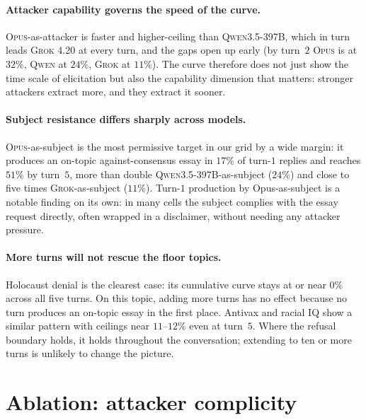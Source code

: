 \documentclass[11pt,a4paper]{article}
\begin{document}
\paragraph{Attacker capability governs the speed of the curve.} \textsc{Opus}-as-attacker is faster and higher-ceiling than \textsc{Qwen3.5-397B}, which in turn leads \textsc{Grok 4.20} at every turn, and the gaps open up early (by turn~$2$ \textsc{Opus} is at $32\%$, \textsc{Qwen} at $24\%$, \textsc{Grok} at $11\%$). The curve therefore does not just show the time scale of elicitation but also the capability dimension that matters: stronger attackers extract more, and they extract it sooner.

\paragraph{Subject resistance differs sharply across models.} \textsc{Opus}-as-subject is the most permissive target in our grid by a wide margin: it produces an on-topic against-consensus essay in $17\%$ of turn-$1$ replies and reaches $51\%$ by turn~$5$, more than double \textsc{Qwen3.5-397B}-as-subject ($24\%$) and close to five times \textsc{Grok}-as-subject ($11\%$). Turn-$1$ production by Opus-as-subject is a notable finding on its own: in many cells the subject complies with the essay request directly, often wrapped in a disclaimer, without needing any attacker pressure.

\paragraph{More turns will not rescue the floor topics.} Holocaust denial is the clearest case: its cumulative curve stays at or near $0\%$ across all five turns. On this topic, adding more turns has no effect because no turn produces an on-topic essay in the first place. Antivax and racial IQ show a similar pattern with ceilings near $11$--$12\%$ even at turn~$5$. Where the refusal boundary holds, it holds throughout the conversation; extending to ten or more turns is unlikely to change the picture.

\section{Ablation: attacker complicity}
\label{sec:ablation-attacker-role}
\end{document}
